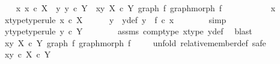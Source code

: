 \begin{isabellebody}
\ \ \isamarkupfalse%
\ {\isachardoublequoteopen}{\isasymAnd}x{\isachardot}{\kern0pt}\ x\ {\isasymin}\isactrlsub c\ X\ {\isasymLongrightarrow}\ {\isasymexists}y{\isachardot}{\kern0pt}\ y\ {\isasymin}\isactrlsub c\ Y\ {\isasymand}\ {\isasymlangle}x{\isacharcomma}{\kern0pt}y{\isasymrangle}\ {\isasymin}\isactrlbsub X\ {\isasymtimes}\isactrlsub c\ Y\isactrlesub \ {\isacharparenleft}{\kern0pt}graph\ f{\isacharcomma}{\kern0pt}\ graph{\isacharunderscore}{\kern0pt}morph\ f{\isacharparenright}{\kern0pt}{\isachardoublequoteclose}\isanewline
\ \ \isamarkupfalse%
\ {\isacharminus}{\kern0pt}\ \isanewline
\ \ \ \ \isamarkupfalse%
\ x\ \isanewline
\ \ \ \ \isamarkupfalse%
\ x{\isacharunderscore}{\kern0pt}type{\isacharbrackleft}{\kern0pt}type{\isacharunderscore}{\kern0pt}rule{\isacharbrackright}{\kern0pt}{\isacharcolon}{\kern0pt}\ {\isachardoublequoteopen}x\ {\isasymin}\isactrlsub c\ X{\isachardoublequoteclose}\isanewline
\ \ \ \ \isamarkupfalse%
\ y\ \ y{\isacharunderscore}{\kern0pt}def{\isacharcolon}{\kern0pt}\ {\isachardoublequoteopen}y\ {\isacharequal}{\kern0pt}\ f\ {\isasymcirc}\isactrlsub c\ x{\isachardoublequoteclose}\isanewline
\ \ \ \ \ \ \isamarkupfalse%
\ simp\isanewline
\ \ \ \ \isamarkupfalse%
\ \isamarkupfalse%
\ y{\isacharunderscore}{\kern0pt}type{\isacharbrackleft}{\kern0pt}type{\isacharunderscore}{\kern0pt}rule{\isacharbrackright}{\kern0pt}{\isacharcolon}{\kern0pt}\ {\isachardoublequoteopen}y\ {\isasymin}\isactrlsub c\ Y{\isachardoublequoteclose}\isanewline
\ \ \ \ \ \ \isamarkupfalse%
\ assms\ comp{\isacharunderscore}{\kern0pt}type\ x{\isacharunderscore}{\kern0pt}type\ y{\isacharunderscore}{\kern0pt}def\ \isamarkupfalse%
\ blast\isanewline
\isanewline
\ \ \ \ \isamarkupfalse%
\ {\isachardoublequoteopen}{\isasymlangle}x{\isacharcomma}{\kern0pt}y{\isasymrangle}\ {\isasymin}\isactrlbsub X\ {\isasymtimes}\isactrlsub c\ Y\isactrlesub \ {\isacharparenleft}{\kern0pt}graph\ f{\isacharcomma}{\kern0pt}\ graph{\isacharunderscore}{\kern0pt}morph\ f{\isacharparenright}{\kern0pt}{\isachardoublequoteclose}\isanewline
\ \ \ \ \isamarkupfalse%
{\isacharparenleft}{\kern0pt}unfold\ relative{\isacharunderscore}{\kern0pt}member{\isacharunderscore}{\kern0pt}def{\isacharcomma}{\kern0pt}\ safe{\isacharparenright}{\kern0pt}\isanewline
\ \ \ \ \ \ \isamarkupfalse%
\ {\isachardoublequoteopen}{\isasymlangle}x{\isacharcomma}{\kern0pt}y{\isasymrangle}\ {\isasymin}\isactrlsub c\ X\ {\isasymtimes}\isactrlsub c\ Y{\isachardoublequoteclose}\isanewline

\end{isabellebody}
